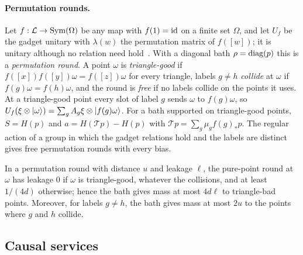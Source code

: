\paragraph{Permutation rounds.} Let $f:\mathcal L\to\operatorname{Sym}(\Omega)$ be any map with $f(1)=\mathrm{id}$ on a finite set $\Omega$, and let $U_f$ be the gadget
unitary with $\lambda(w)$ the permutation matrix of $f([w])$; it is unitary although no relation need hold~\cite[proof of
Proposition~12.1]{DouglasMghirbiC}. With a diagonal bath $\rho=\operatorname{diag}(p)$ this is a \emph{permutation round}. A point $\omega$ is
\emph{triangle-good} if $f([x])f([y])\omega=f([z])\omega$ for every triangle, labels $g\ne h$ \emph{collide} at $\omega$ if
$f(g)\omega=f(h)\omega$, and the round is \emph{free} if no labels collide on the points it uses. At a triangle-good point every slot of label
$g$ sends $\omega$ to $f(g)\omega$, so $U_f(\xi\otimes\lvert \omega\rangle)=\sum_gA_g\xi\otimes\lvert f(g)\omega\rangle$. For a bath supported on triangle-good
points, $S=H(p)$ and $a=H(\mathcal Tp)-H(p)$ with $\mathcal Tp=\sum_g\mu_gf(g)_*p$. The regular action of a group in which the gadget relations
hold and the labels are distinct gives free permutation rounds with every bias.

\begin{lemma}\label{lem:perm-leak}
In a permutation round with distance $u$ and leakage $\ell$, the pure-point round at $\omega$ has leakage $0$ if $\omega$ is triangle-good,
whatever the collisions, and at least $1/(4d)$ otherwise; hence the bath gives mass at most $4d\ell$ to triangle-bad points. Moreover, for
labels $g\ne h$, the bath gives mass at most $2u$ to the points where $g$ and $h$ collide.
\end{lemma}

\subsection{Causal services}\label{sec:services}

